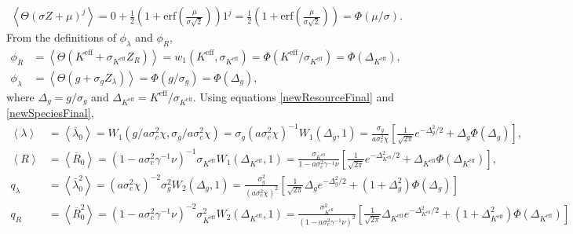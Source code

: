 \documentclass[10pt]{article}
\newcommand{\1}{\mathbf 1}
\newcommand{\ip}[1]{\left< #1 \right>}
\begin{document}
{\begin{align}
	\ip{\Theta(\sigma Z + \mu)^j}
	=
	0
	+
	\frac{1}{2}
	(
		1 + \mathrm{erf}\left(
			\frac{\mu}{\sigma\sqrt{2}}
		\right)
	) 1^j
	=
	\frac{1}{2}
	(
		1 + \mathrm{erf}\left(
			\frac{\mu}{\sigma\sqrt{2}}
		\right)
	)
	=
	\Phi(\mu/\sigma).
\end{align}
From the definitions of $\phi_\lambda$ and $\phi_R$,
\begin{align}
	\phi_R
	&=
	\ip{\Theta(K^\text{eff} + \sigma_{K^\text{eff}} Z_R)}
	=
	w_1(K^\text{eff},\sigma_{K^\text{eff}})
	=
	\Phi(K^\text{eff}/\sigma_{K^\text{eff}})
	=
	\Phi(\Delta_{K^\text{eff}}),
	\\
	\phi_\lambda
	&=
	\ip{\Theta(g + \sigma_g Z_\lambda)}
	=
	\Phi(g/\sigma_g)
	=
	\Phi(\Delta_g),
\end{align}
where $\Delta_g = g/\sigma_g$ and $\Delta_{K^\text{eff}} = K^\text{eff}/\sigma_{K^\text{eff}}$.
Using equations \ref{newResourceFinal} and \ref{newSpeciesFinal},
\begin{align}
	\ip{\lambda}
	&=
	\ip{\overline{\lambda}_0}
	=
	W_1 (g/a\sigma_c^2 \chi, \sigma_g/a \sigma_c^2 \chi)
	=
	\sigma_g(a
	 \sigma_c^2 \chi)^{-1}
	W_1(\Delta_g,1)
	=
	\frac{\sigma_g}{
		a \sigma_c^2 \chi
	}
	\left[
	\frac{1}{\sqrt{2\pi}}e^{-\Delta_g^2/2} + \Delta_g \Phi(\Delta_g)\right],\\
	\ip{R}
	&=
	\ip{\overline{R}_0}
	=
	(1-a \sigma_c^2 \gamma^{-1} \nu)^{-1}\sigma_{K^\text{eff}}W_1(\Delta_{K^\text{eff}},1)
	=
	\frac{\sigma_{K^\text{eff}}}{1-a \sigma_c^2 \gamma^{-1} \nu}
	\left[
	\frac{1}{\sqrt{2\pi}}e^{-\Delta_{K^\text{eff}}^2/2} + \Delta_{K^\text{eff}}
	\Phi(\Delta_{K^\text{eff}})
	\right],
	\\
	q_\lambda
	&
	=
	\ip{\overline{\lambda}_0^2}
	=
	(a \sigma_c^2  \chi) ^{-2}\sigma_g^2
	W_2({\Delta_g},1)
	=
	\frac{\sigma_g^2}{(a \sigma_c^2  \chi)^2}
	\left[
		\frac{1}{\sqrt{2\pi}} \Delta_g e^{-\Delta_g^2/2}
		+
		(1+\Delta_g^2)\Phi(\Delta_g)
	\right]
	\\
	q_R
	&=
	\ip{\overline{R}_0^2}
	=
	(1-a \sigma_c^2 \gamma^{-1} \nu)^{-2}\sigma_{K^\text{eff}}^{2}W_2(\Delta_{K^\text{eff}},1)
	=
	\frac{\sigma_{K^\text{eff}}^2}{(1-a \sigma_c^2 \gamma^{-1} \nu)^2}
		\left[
			\frac{1}{\sqrt{2\pi}} \Delta_{K^\text{eff}} e^{-\Delta_{K^\text{eff}}^2/2}
			+
			(1+\Delta_{K^\text{eff}}^2) \Phi(\Delta_{K^\text{eff}})
		\right]
\end{align}


}
\end{document}
